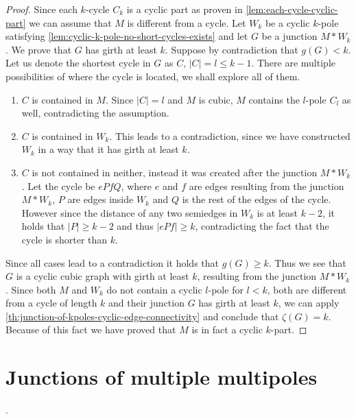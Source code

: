 \documentclass[12pt, twoside]{book}
\begin{document}
\begin{proof}
	Since each $k$-cycle $C_k$ is a cyclic part as proven in \cref{lem:each-cycle-cyclic-part} we can assume that $M$ is different from a cycle. Let $W_k$ be a cyclic $k$-pole satisfying \cref{lem:cyclic-k-pole-no-short-cycles-exists} and let $G$ be a junction $M*W_k$. We prove that $G$ has girth at least $k$. Suppose by contradiction that $g(G)<k$. Let us denote the shortest cycle in $G$ as $C$, $|C|=l\leq k-1$. There are multiple possibilities of where the cycle is located, we shall explore all of them.
	\begin{enumerate}
		\item $C$ is contained in $M$. Since $|C|=l$ and $M$ is cubic, $M$ contains the $l$-pole $C_l$ as well, contradicting the assumption.
		\item $C$ is contained in $W_k$. This leads to a contradiction, since we have constructed $W_k$ in a way that it has girth at least $k$.
		\item $C$ is not contained in neither, instead it was created after the junction $M*W_k$. Let the cycle be $ePfQ$, where $e$ and $f$ are edges resulting from the junction $M*W_k$, $P$ are edges inside $W_k$ and $Q$ is the rest of the edges of the cycle. However since the distance of any two semiedges in $W_k$ is at least $k-2$, it holds that $|P|\geq k-2$ and thus $|ePf|\geq k$, contradicting the fact that the cycle is shorter than $k$.
	\end{enumerate}

	Since all cases lead to a contradiction it holds that $g(G)\geq k$. Thus we see that $G$ is a cyclic cubic graph with girth at least $k$, resulting from the junction $M*W_k$. Since both $M$ and $W_k$ do not contain a cyclic $l$-pole for $l<k$, both are different from a cycle of length $k$ and their junction $G$ has girth at least $k$, we can apply \cref{th:junction-of-kpoles-cyclic-edge-connectivity} and conclude that $\zeta(G)=k$. Because of this fact we have proved that $M$ is in fact a cyclic $k$-part.
\end{proof}


\section{Junctions of multiple multipoles}

.
\end{document}
